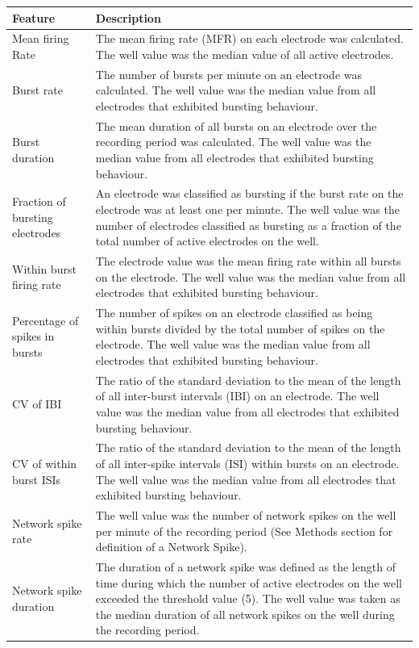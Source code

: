 \documentclass{article}
\begin{document}
\begin{table}
  \centering
  	\begin{tabular}{|l|m{11cm}|}
  		\hline
  		Feature & Description
  		\\ \hline 
  		Mean firing Rate & The mean firing rate (MFR) on each electrode was calculated. The well value was the median value of all active electrodes. 
  		\\ Burst rate  & The number of bursts per minute on an electrode was calculated. The well value was the median value from all electrodes that exhibited bursting behaviour. 
  		\\ Burst duration  & The mean duration of all bursts on an electrode over the recording period was calculated. The well value was the median value from all electrodes that exhibited bursting behaviour.
  		\\ Fraction of bursting electrodes  & An electrode was classified as bursting if the burst rate on the electrode was at least one per minute. The well value was the number of electrodes classified as bursting as a fraction of the total number of active electrodes on the well.  
  		\\ Within burst firing rate   & The electrode value was the mean firing rate within all bursts on the electrode. The well value was the median value from all electrodes that exhibited bursting behaviour. 
  		\\ Percentage of spikes in bursts & The number of spikes on an electrode classified as being within bursts divided by the total number of spikes on the electrode. The well value was the median value from all electrodes that exhibited bursting behaviour.  
  		\\ CV of IBI & The ratio of the standard deviation to the mean of the length of all inter-burst intervals (IBI) on an electrode. The well value was the median value from all electrodes that exhibited bursting behaviour.  
  		\\ CV of within burst ISIs &  The ratio of the standard deviation to the mean of the length of all inter-spike intervals (ISI) within bursts on an electrode. The well value was the median value from all electrodes that exhibited bursting behaviour.  
  		\\ Network spike rate &  The well value was the number of network spikes on the well per minute of the recording period (See Methods section for definition of a Network Spike).
  		\\ Network spike duration  & The duration of a network spike was defined as the length of time during which the number of active electrodes on the well exceeded the threshold value (5). The well value was taken as the median duration of all network spikes on the well during the recording period.

\end{tabular}
\end{table}
\end{document}
